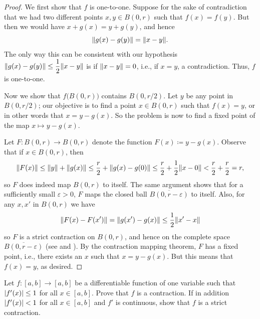 \begin{proof}
  We first show that \(f\) is one-to-one.
  Suppose for the sake of contradiction that we had two different points \(x, y \in B(0, r)\) such that \(f(x) = f(y)\).
  But then we would have \(x + g(x) = y + g(y)\), and hence
  \[
    \norm*{g(x) - g(y)} = \norm*{x - y}.
  \]
  The only way this can be consistent with our hypothesis \(\norm*{g(x) - g(y)} \leq \dfrac{1}{2} \norm*{x - y}\) is if \(\norm*{x - y} = 0\), i.e., if \(x = y\), a contradiction.
  Thus, \(f\) is one-to-one.

  Now we show that \(f\big(B(0, r)\big)\) contains \(B(0, r / 2)\).
  Let \(y\) be any point in \(B(0, r / 2)\);
  our objective is to find a point \(x \in B(0, r)\) such that \(f(x) = y\), or in other words that \(x = y - g(x)\).
  So the problem is now to find a fixed point of the map \(x \mapsto y - g(x)\).

  Let \(F : B(0, r) \to B(0, r)\) denote the function \(F(x) \coloneqq y - g(x)\).
  Observe that if \(x \in B(0, r)\), then
  \[
    \norm*{F(x)} \leq \norm*{y} + \norm*{g(x)} \leq \dfrac{r}{2} + \norm*{g(x) - g(0)} \leq \dfrac{r}{2} + \dfrac{1}{2} \norm*{x - 0} < \dfrac{r}{2} + \dfrac{r}{2} = r,
  \]
  so \(F\) does indeed map \(B(0, r)\) to itself.
  The same argument shows that for a sufficiently small \(\varepsilon > 0\), \(F\) maps the closed ball \(\overline{B(0, r - \varepsilon)}\) to itself.
  Also, for any \(x, x'\) in \(B(0, r)\) we have
  \[
    \norm*{F(x) - F(x')} = \norm*{g(x') - g(x)} \leq \dfrac{1}{2} \norm*{x' - x}
  \]
  so \(F\) is a strict contraction on \(B(0, r)\), and hence on the complete space \(\overline{B(0, r - \varepsilon)}\) (see  and ).
  By the contraction mapping theorem, \(F\) has a fixed point, i.e., there exists an \(x\) such that \(x = y - g(x)\).
  But this means that \(f(x) = y\), as desired.
\end{proof}

\exercisesection

\begin{ex}\label{ii:ex:6.6.1}
  Let \(f : [a, b] \to [a, b]\) be a differentiable function of one variable such that \(\abs{f'(x)} \leq 1\) for all \(x \in [a, b]\).
  Prove that \(f\) is a contraction.
  If in addition \(\abs{f'(x)} < 1\) for all \(x \in [a, b]\) and \(f'\) is continuous, show that \(f\) is a strict contraction.
\end{ex}

